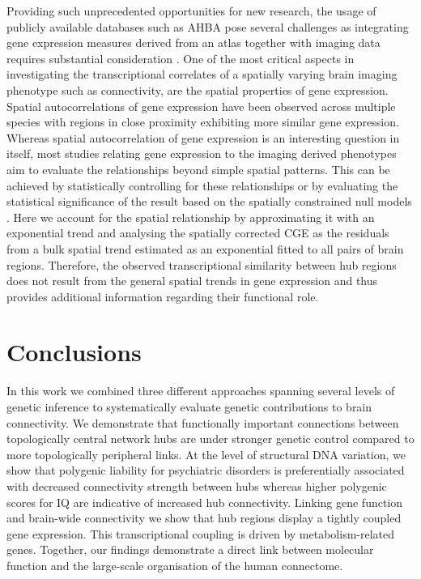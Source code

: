 Providing such unprecedented opportunities for new research, the usage of publicly available databases such as AHBA pose several challenges as integrating gene expression measures derived from an atlas together with imaging data requires substantial consideration \citep{Arnatkeviciute2019,Fornito2019}. One of the most critical aspects in investigating the transcriptional correlates of a spatially varying brain imaging phenotype such as connectivity, are the spatial properties of gene expression. Spatial autocorrelations of gene expression have been observed across multiple species \citep{Arnatkeviciute2018,Burt2018,Fornito2019,Fulcher2016} with regions in close proximity exhibiting more similar gene expression. Whereas spatial autocorrelation of gene expression is an interesting question in itself, most studies relating gene expression to the imaging derived phenotypes aim to evaluate the relationships beyond simple spatial patterns. This can be achieved by statistically controlling for these relationships \citep{Fakhry2015a,Fulcher2016} or by evaluating the statistical significance of the result based on the spatially constrained null models \citep{Burt2018,Romero-Garcia2018,Whitaker2016a,Vasa2018,Vertes2016b}. Here we account for the spatial relationship by approximating it with an exponential trend and analysing the spatially corrected CGE as the residuals from a bulk spatial trend estimated as an exponential fitted to all pairs of brain regions. Therefore, the observed transcriptional similarity between hub regions does not result from the general spatial trends in gene expression and thus provides additional information regarding their functional role. 

\section{Conclusions}
In this work we combined three different approaches spanning several levels of genetic inference to systematically evaluate genetic contributions to brain connectivity. We demonstrate that functionally important connections between topologically central network hubs are under stronger genetic control compared to more topologically peripheral links. At the level of structural DNA variation, we show that polygenic liability for psychiatric disorders is preferentially associated with decreased connectivity strength between hubs whereas higher polygenic scores for IQ are indicative of increased hub connectivity. Linking gene function and brain-wide connectivity we show that hub regions display a tightly coupled gene expression. This transcriptional coupling is driven by metabolism-related genes. Together, our findings demonstrate a direct link between molecular function and the large-scale organisation of the human connectome. 


